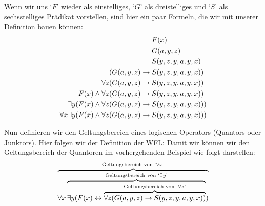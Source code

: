 Wenn wir uns `$F$' wieder als einstelliges, `$G$' als dreistelliges und `$S$' als sechsstelliges Prädikat vorstellen, sind hier ein paar Formeln, die wir mit unserer Definition bauen können:
	\begin{align*}
		& \mathord{F}(x)\\
		& \mathord{G}(a,y,z)\\
		& \mathord{S}(y,z,y,a,y,x)\\
		(\mathord{G}(a,y,z) \rightarrow {}& \mathord{S}(y,z,y,a,y,x))\\
		\forall z (\mathord{G}(a,y,z) \rightarrow {}& \mathord{S}(y,z,y,a,y,x))\\
		\mathord{F}(x) \wedge \forall z (\mathord{G}(a,y,z) \rightarrow {}& \mathord{S}(y,z,y,a,y,x))\\
		\exists y (\mathord{F}(x) \wedge \forall z (\mathord{G}(a,y,z) \rightarrow {}& \mathord{S}(y,z,y,a,y,x)))\\
		\forall x \exists y (\mathord{F}(x) \wedge \forall z (\mathord{G}(a,y,z) \rightarrow {}& \mathord{S}(y,z,y,a,y,x)))
	\end{align*}

Nun definieren wir den Geltungsbereich eines logischen Operators (Quantors oder Junktors). Hier folgen wir der Definition der WFL:
Damit wir können wir den Geltungsbereich der Quantoren im vorhergehenden Beispiel wie folgt darstellen:
$$\overbrace{\forall x \overbrace{\exists y (\mathord{F}(x) \leftrightarrow \overbrace{\forall z (\mathord{G}(a,y,z) \rightarrow \mathord{S}(y,z,y,a,y,x))}^{\text{Geltungsbereich von `}\forall z\text{'}}}^{\text{Geltungsbereich von `}\exists y\text{'}})}^{\text{Geltungsbereich von `$\forall x$'}}$$


